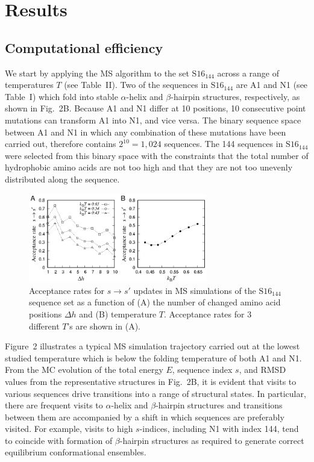 \documentclass[
aip,
rsi,%
amsmath,amssymb,
reprint,%
]{revtex4-1}
\newcommand	 {\sbar}	{{s}}
\newcommand {\SR}		{${\mathrm{S16}_{144}}$}
\begin{document}
\section{Results}

\subsection{Computational efficiency}

We start by applying the MS algorithm to the set {\SR} across a range of temperatures $T$ (see Table~II). Two of the sequences in {\SR} are A1 and N1 (see Table~I) which fold into stable $\alpha$-helix and $\beta$-hairpin structures, respectively, as shown in Fig.~2B. Because A1 and N1 differ at 10 positions, 10 consecutive point mutations can transform A1 into N1, and vice versa. The binary sequence space between A1 and N1 in which any combination of these mutations have been carried out, therefore contains $2^{10}=1,024$ sequences. The 144 sequences in {\SR} were selected from this binary space with the constraints that the total number of hydrophobic amino acids are not too high and that they are not too unevenly distributed along the sequence.~\cite{Holzgrafe2014}

\begin{figure}
\includegraphics[width=7.8cm]{Fig3}
\caption{Acceptance rates for $\sbar\rightarrow\sbar'$ updates in MS simulations of the {\SR} sequence set as a function of (A) the number of changed amino acid positions $\Delta h$ and (B) temperature $T$. Acceptance rates for 3 different $T$'s are shown in (A).}
\end{figure}

Figure~2 illustrates a typical MS simulation trajectory carried out at the lowest studied temperature which is below the folding temperature of both A1 and N1.~\cite{Holzgrafe2014,Holzgrafe2015} From the MC evolution of the total energy $E$, sequence index $\sbar$, and RMSD values from the representative structures in Fig.~2B, it is evident that visits to various sequences drive transitions into a range of structural states. In particular, there are frequent visits to $\alpha$-helix and $\beta$-hairpin structures and transitions between them are accompanied by a shift in which sequences are preferably visited. For example, visits to high $\sbar$-indices, including N1 with index 144, tend to coincide with formation of $\beta$-hairpin structures as required to generate correct equilibrium conformational ensembles. 
\end{document}
